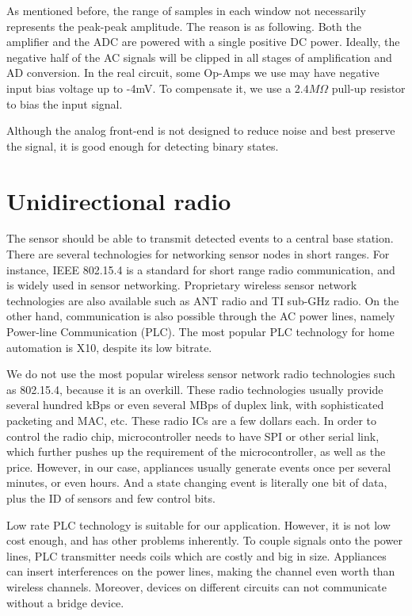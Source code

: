 As mentioned before, the range of samples in each window not necessarily represents the peak-peak amplitude. The reason is as following. Both the amplifier and the ADC are powered with a single positive DC power. Ideally, the negative half of the AC signals will be clipped in all stages of amplification and AD conversion. In the real circuit, some Op-Amps we use may have negative input bias voltage up to -4mV. To compensate it, we use a $2.4M\Omega$ pull-up resistor to bias the input signal. 

Although the analog front-end is not designed to reduce noise and best preserve the signal, it is good enough for detecting binary states. 

\section{Unidirectional radio}

The sensor should be able to transmit detected events to a central base station. There are several technologies for networking sensor nodes in short ranges. For instance, IEEE 802.15.4 is a standard for short range radio communication, and is widely used in sensor networking. Proprietary wireless sensor network technologies are also available such as ANT radio and TI sub-GHz radio. On the other hand, communication is also possible through the AC power lines, namely Power-line Communication (PLC). The most popular PLC technology for home automation is X10, despite its low bitrate. 

We do not use the most popular wireless sensor network radio technologies such as 802.15.4, because it is an overkill. These radio technologies usually provide several hundred kBps or even several MBps of duplex link, with sophisticated packeting and MAC, etc. These radio ICs are a few dollars each. In order to control the radio chip, microcontroller needs to have SPI or other serial link, which further pushes up the requirement of the microcontroller, as well as the price. However, in our case, appliances usually generate events once per several minutes, or even hours. And a state changing event is literally one bit of data, plus the ID of sensors and few control bits. 

Low rate PLC technology is suitable for our application. However, it is not low cost enough, and has other problems inherently. To couple signals onto the power lines, PLC transmitter needs coils which are costly and big in size. Appliances can insert interferences on the power lines, making the channel even worth than wireless channels. Moreover, devices on different circuits can not communicate without a bridge device. 

